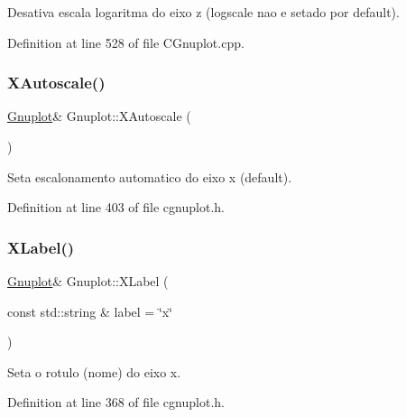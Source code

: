 Desativa escala logaritma do eixo z (logscale nao e setado por default). 



Definition at line 528 of file C\+Gnuplot.\+cpp.

\mbox{\label{class_gnuplot_a4260baaa8fa1c269dd6eec31dcada605}} 
\subsubsection{\texorpdfstring{X\+Autoscale()}{XAutoscale()}}
{\footnotesize\ttfamily \hyperlink{class_gnuplot}{Gnuplot}\& Gnuplot\+::\+X\+Autoscale (\begin{DoxyParamCaption}{ }\end{DoxyParamCaption})\hspace{0.3cm}{\ttfamily [inline]}}



Seta escalonamento automatico do eixo x (default). 



Definition at line 403 of file cgnuplot.\+h.

\mbox{\label{class_gnuplot_ac36ea75f0759c98da946389e60c12278}} 
\subsubsection{\texorpdfstring{X\+Label()}{XLabel()}}
{\footnotesize\ttfamily \hyperlink{class_gnuplot}{Gnuplot}\& Gnuplot\+::\+X\+Label (\begin{DoxyParamCaption}\item[{const std\+::string \&}]{label = {\ttfamily \char`\"{}x\char`\"{}} }\end{DoxyParamCaption})\hspace{0.3cm}{\ttfamily [inline]}}



Seta o rotulo (nome) do eixo x. 



Definition at line 368 of file cgnuplot.\+h.

\mbox{\label{class_gnuplot_a16763e22005b72ebe62c09653b2dc8fa}} 
